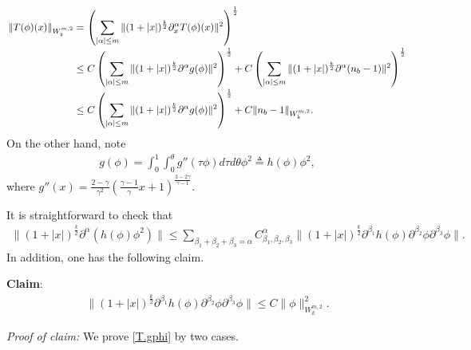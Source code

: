 \documentclass[11pt]{amsart}
\numberwithin{equation}{section}
\begin{document}
\begin{eqnarray}\label{T.nb}
\arraycolsep=1.5pt
\begin{array}[b]{rl}
      \|T(\phi)(x)\|_{W^{m,2}_{k}}
   =  & \displaystyle \left(\sum_{|\alpha|\leq m}\|(1+|x|)^{\frac{k}{2}}\partial_{x}^{\alpha}T(\phi)(x)\|^2\right)^{\frac{1}{2}}\\[5mm]
 \leq & \displaystyle C\left(\sum_{|\alpha|\leq m}\|(1+|x|)^{\frac{k}{2}}\partial^{\alpha}g(\phi)\|^2\right)^{\frac{1}{2}}
 +C\left(\sum_{|\alpha|\leq m}\|(1+|x|)^{\frac{k}{2}}\partial^{\alpha}(n_{b}-1)\|^2\right)^{\frac{1}{2}}\\[5mm]
 \leq & \displaystyle C\left(\sum_{|\alpha|\leq m}\|(1+|x|)^{\frac{k}{2}}\partial^{\alpha}g(\phi)\|^2\right)^{\frac{1}{2}}
 +C\|n_{b}-1\|_{W^{m,2}_{k}}.
 \end{array}
\end{eqnarray}
On the other hand, note
\begin{eqnarray*}
 g(\phi)=\int_{0}^{1}\int_{0}^{\theta}g''(\tau\phi)d\tau d\theta
 \phi^{2}\triangleq h(\phi)\phi^{2},
\end{eqnarray*}
where
$g''(x)=\frac{2-\gamma}{\gamma^{2}}\left(\frac{\gamma-1}{\gamma}x+1\right)^{\frac{3-2\gamma}{\gamma-1}}$.

It is straightforward to check that
\begin{eqnarray*}
\|(1+|x|)^{\frac{k}{2}}\partial^{\alpha}(h(\phi)\phi^{2})\|\leq
\sum_{\beta_{1}+\beta_{2}+\beta_{3}=\alpha}C_{\beta_1,\beta_2,\beta_{3}}^{\alpha}
\|(1+|x|)^{\frac{k}{2}}\partial^{\beta_{1}}h(\phi)\partial^{\beta_2}\phi\partial^{\beta_3}\phi\|.
\end{eqnarray*}
 In addition, one has the following claim.

\textbf{Claim}:
\begin{eqnarray}\label{T.gphi}
\|(1+|x|)^{\frac{k}{2}}\partial^{\beta_{1}}h(\phi)\partial^{\beta_2}\phi\partial^{\beta_3}\phi\|\leq
C \|\phi\|^2_{W^{m,2}_{k}}.
\end{eqnarray}

\textit{Proof of claim:} We prove \eqref{T.gphi} by two cases.
\end{document}
